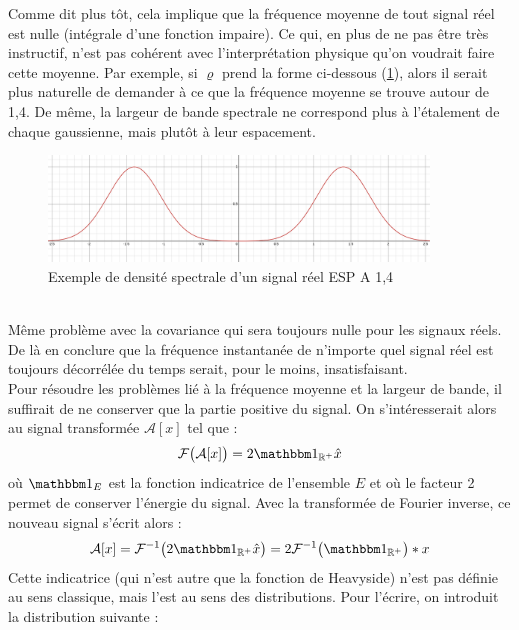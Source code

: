 Comme dit plus tôt, cela implique que la fréquence moyenne de tout signal réel est nulle (intégrale d'une fonction impaire). Ce qui, en plus de ne pas être très instructif, n'est pas cohérent avec l'interprétation physique qu'on voudrait faire cette moyenne. Par exemple, si $\varrho$ prend la forme ci-dessous (\cref{fig:densi_spec_sym}), alors il serait plus naturelle de demander à ce que la fréquence moyenne se trouve autour de 1,4. De même, la largeur de bande spectrale ne correspond plus à l'étalement de chaque gaussienne, mais plutôt à leur espacement.
\\
\begin{figure}[h]\centering
	\includegraphics[width=0.9\textwidth]{fig/densi_spec_sym}
	\caption{Exemple de densité spectrale d'un signal réel ESP A 1,4}
	\label{fig:densi_spec_sym}
\end{figure}
\\
Même problème avec la covariance qui sera toujours nulle pour les signaux réels. De là en conclure que la fréquence instantanée de n'importe quel signal réel est toujours décorrélée du temps serait, pour le moins, insatisfaisant.
\\

Pour résoudre les problèmes lié à la fréquence moyenne et la largeur de bande, il suffirait de ne conserver que la partie positive du signal. On s'intéresserait alors au signal transformée $\mathcal{A}[x]$ tel que :
\[\mathcal{F}\big(\mathcal{A}[x]\big) = 2\one_{\R^+}\hat{x}\]
où $\one_E$ est la fonction indicatrice de l'ensemble $E$ et où le facteur 2 permet de conserver l'énergie du signal.
Avec la transformée de Fourier inverse, ce nouveau signal s'écrit alors :
\[\mathcal{A}[x] = \mathcal{F}^{-1}\big( 2\one_{\R^+}\hat{x} \big) = 2 \mathcal{F}^{-1}\big(\one_{\R^+}\big) * x\]
Cette indicatrice (qui n'est autre que la fonction de Heavyside) n'est pas définie au sens classique, mais l'est au sens des distributions. Pour l'écrire, on introduit la distribution suivante :
\\

